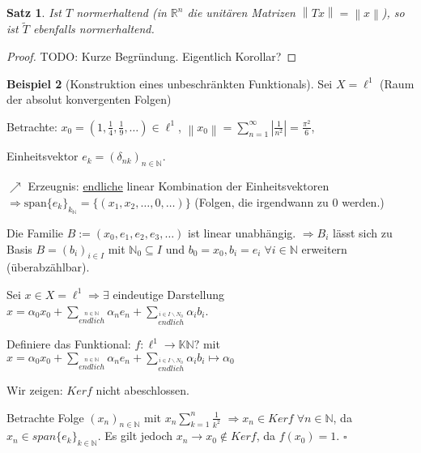 \documentclass[ngerman]{report}
\theoremstyle{plain}%
\newtheorem{thm}{Satz}[chapter]
\theoremstyle{definition}%
\newtheorem{bsp}[thm]{Beispiel}
\theoremstyle{myStyle}
\newcommand{\R}{\mathbb{R}}
\newcommand{\N}{\mathbb{N}}
\newcommand{\K}{\mathbb{K}}
\newcommand{\norm}[1]{\left \|#1\right\| }
\newcommand{\df}[1][]{%
	\overset{#1}{\Rightarrow}
}
\begin{document}
	\begin{thm}
					Ist $T$ normerhaltend (in $\R^n$ die unitären Matrizen $\norm{Tx} = \norm{x}$), so ist $\tilde{T}$ ebenfalls normerhaltend.
	\end{thm}
		\begin{proof}
						TODO: Kurze Begründung. Eigentlich Korollar?%
		\end{proof}

	\begin{bsp}[Konstruktion eines unbeschränkten Funktionals]
		Sei $X= \ell^1$ ({Raum der absolut konvergenten Folgen})\par
		Betrachte: $x_0 = (1, \frac{1}{4}, \frac{1}{9},\dots) \in \ell^1$, 
		$\norm{x_0} = \sum_{n=1}^\infty |\frac{1}{n^2}| = \frac{\pi^2}{6} $,\par
		Einheitsvektor $e_k = (\delta_{nk})_{n\in\N}$.\par 
		$\nearrow$ Erzeugnis: \underline{endliche} linear Kombination der Einheitsvektoren 
		$\df \text{span} \{e_k\}_{k_\N} = \{(x_1,x_2,\dots,0,\dots)\}$ (Folgen, die irgendwann zu $0$ werden.)\par
		Die Familie $B := (x_0,e_1,e_2,e_3,\dots)$ ist linear unabhängig.
		$\df B_i$ lässt sich zu Basis $B = (b_i)_{i\in I}$ mit $\N_0 \subseteq I$ und $b_0 = x_0, b_i = e_i \; \forall i\in \N$ erweitern (überabzählbar).\par
		Sei $x\in X= \ell^1 \df \exists$ eindeutige Darstellung 
		$x = \alpha_0 x_0 +\sum_{\overset{n\in\N}{endlich}} \alpha_n e_n + \sum_{\overset{i\in I\backslash N_0}{endlich}}\alpha_i b_i$. \par
		Definiere das Funktional: $f: \ell^1 \to \K \N?$ mit $x = \alpha_0 x_0 +\sum_{\overset{n\in\N}{endlich}} \alpha_n e_n + \sum_{\overset{i\in I\backslash N_0}{endlich}}\alpha_i b_i \mapsto \alpha_0$\par
	Wir zeigen: $Ker f$ nicht abeschlossen.\par
		Betrachte Folge $(x_n)_{n\in\N}$ mit $x_n \sum_{k=1}^n \frac{1}{k^2}$		 
		$\df x_n\in Ker f \; \forall n\in\N$, da $x_n\in span\{e_k\}_{k\in\N}$. 
		Es gilt jedoch $x_n \to x_0 \not\in Ker f$, da $f(x_0) = 1$. \hfill $\square$ 
	\end{bsp}
\end{document}

